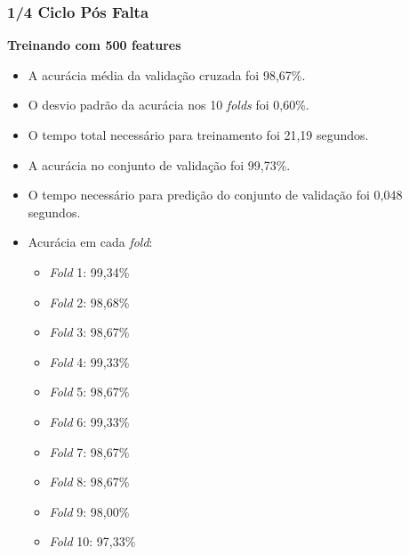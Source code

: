 \subsubsection{1/4 Ciclo Pós Falta}
\textbf{Treinando com 500 features}
\begin{itemize}
    \item A acurácia média da validação cruzada foi 98,67\%.
    \item O desvio padrão da acurácia nos 10 \textit{folds} foi 0,60\%.
    \item O tempo total necessário para treinamento foi 21,19 segundos.
    \item A acurácia no conjunto de validação foi 99,73\%.
    \item O tempo necessário para predição do conjunto de validação foi 0,048 segundos.
    \item Acurácia em cada \textit{fold}:
    \begin{itemize}
        \item \textit{Fold} 1: 99,34\%
        \item \textit{Fold} 2: 98,68\%
        \item \textit{Fold} 3: 98,67\%
        \item \textit{Fold} 4: 99,33\%
        \item \textit{Fold} 5: 98,67\%
        \item \textit{Fold} 6: 99,33\%
        \item \textit{Fold} 7: 98,67\%
        \item \textit{Fold} 8: 98,67\%
        \item \textit{Fold} 9: 98,00\%
        \item \textit{Fold} 10: 97,33\%
    \end{itemize}
\end{itemize}

